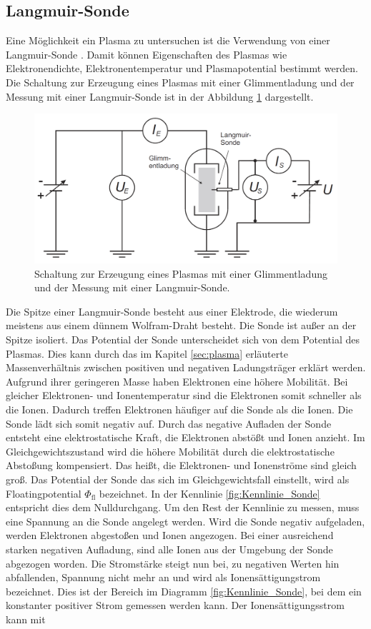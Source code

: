 \subsection{Langmuir-Sonde}\label{sec:Langmuir_Sonde}  
Eine Möglichkeit ein Plasma zu untersuchen ist die Verwendung von einer Langmuir-Sonde \cite{anleitung}. Damit können Eigenschaften des Plasmas wie Elektronendichte, Elektronentemperatur und Plasmapotential bestimmt werden. Die Schaltung zur Erzeugung eines Plasmas mit einer Glimmentladung und der Messung mit einer Langmuir-Sonde ist in der Abbildung \ref{fig:Schaltung_Sonde} dargestellt. 
\begin{figure}[H]
\centering
\includegraphics[scale=0.4]{Schaltung_Sonde.png}
\caption{Schaltung zur Erzeugung eines Plasmas mit einer Glimmentladung und der Messung mit einer Langmuir-Sonde. \cite{anleitung}}
\label{fig:Schaltung_Sonde}
\end{figure}
Die Spitze einer Langmuir-Sonde besteht aus einer Elektrode, die wiederum meistens aus einem dünnem Wolfram-Draht besteht. Die Sonde ist außer an der Spitze isoliert. Das Potential der Sonde unterscheidet sich von dem Potential des Plasmas. Dies kann durch das im Kapitel \ref{sec:plasma} erläuterte Massenverhältnis zwischen positiven und negativen Ladungsträger erklärt werden. Aufgrund ihrer geringeren Masse haben Elektronen eine höhere Mobilität. Bei gleicher Elektronen- und Ionentemperatur sind die Elektronen somit schneller als die Ionen. Dadurch treffen Elektronen häufiger auf die Sonde als die Ionen. Die Sonde lädt sich somit negativ auf. Durch das negative Aufladen der Sonde entsteht eine elektrostatische Kraft, die Elektronen abstößt und  Ionen anzieht. Im Gleichgewichtszustand wird die höhere Mobilität durch die elektrostatische Abstoßung kompensiert. Das heißt, die Elektronen- und Ionenströme sind gleich groß. Das Potential der Sonde das sich im Gleichgewichtsfall einstellt, wird als Floatingpotential $\Phi_{\mathrm{fl}}$ bezeichnet. In der Kennlinie \ref{fig:Kennlinie_Sonde} entspricht dies dem  Nulldurchgang.  Um den Rest der Kennlinie zu messen, muss eine Spannung an die Sonde angelegt werden. Wird die Sonde negativ aufgeladen, werden Elektronen abgestoßen und Ionen angezogen. Bei einer ausreichend starken negativen Aufladung, sind alle Ionen aus der Umgebung der Sonde abgezogen worden. Die Stromstärke steigt nun bei, zu negativen Werten hin abfallenden, Spannung nicht mehr an und wird als Ionensättigungstrom bezeichnet. Dies ist der Bereich im Diagramm \ref{fig:Kennlinie_Sonde}, bei dem ein konstanter positiver Strom gemessen werden kann. Der Ionensättigungsstrom kann mit
